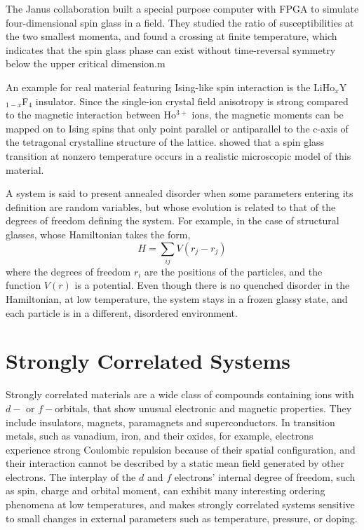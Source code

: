 The Janus collaboration \cite{Banos-2012,TheJanusCollaboration:2012:JFS:2322156.2322158} 
built a special purpose computer with FPGA to simulate
four-dimensional spin glass in a field. They studied the ratio of susceptibilities 
at the two smallest momenta, and found a crossing at finite temperature, which 
indicates that the spin glass phase can exist without time-reversal symmetry
below the upper critical dimension.m

An example for real material featuring Ising-like spin interaction is the 
LiHo$_x$Y$_{1-x}$F$_4$ insulator\cite{2008PhRvB..78e4437B,2007PhRvB..76e4423B}. Since the single-ion crystal field anisotropy
is strong compared to the magnetic interaction between Ho$^{3+}$ ions, the magnetic 
moments can be mapped on to Ising spins that only point parallel or antiparallel
to the c-axis of the tetragonal crystalline structure of the lattice. \citet{2009PhRvL.103h7202T} showed that a spin glass transition at nonzero temperature occurs in a realistic
microscopic model of this material.


A system is said to present annealed disorder when some parameters entering 
its definition are random variables, but whose evolution is related to that 
of the degrees of freedom defining the system. For example, in the case of 
structural glasses, whose Hamiltonian takes the form,
\begin{equation}
  \label{eq:12}
  H=\sum_{ij}V(r_j-r_j)
\end{equation}
where the degrees of freedom $r_i$ are the positions of the particles, and the 
function $V(r)$ is a potential. Even though there is no quenched disorder in
the Hamiltonian, at low temperature, the system stays in a frozen glassy state, 
and each particle is in a different, disordered environment.



\section{Strongly Correlated Systems}
Strongly correlated materials are a wide class of compounds containing ions 
with $d-$ or $f-$orbitals, that show unusual electronic and magnetic properties. 
They include insulators, magnets, paramagnets and superconductors. In transition
metals, such as vanadium, iron, and their oxides, for example, electrons experience
strong Coulombic repulsion because of their spatial configuration, and their 
interaction cannot be described by a static mean field generated by other electrons.
\cite{RevModPhys.56.99,RevModPhys.70.1039}
The interplay of the $d$ and $f$ electrons' internal degree of freedom, such as
spin, charge and orbital moment, can exhibit many interesting ordering phenomena
at low temperatures, and makes strongly correlated systems sensitive to small
changes in external parameters such as temperature, pressure, or doping. 

